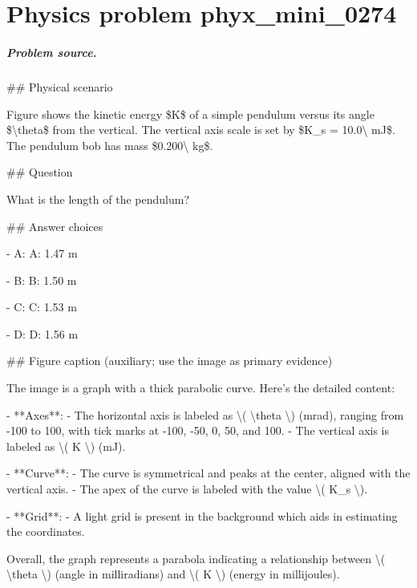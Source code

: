 
\chapter{Physics problem phyx\_mini\_0274}
\label{ch:PhyXMiniProblems_problem_phyx_mini_0274}

\paragraph{Problem source.}
\#\# Physical scenario

Figure shows the kinetic energy \$K\$ of a simple pendulum versus its angle \$\textbackslash{}theta\$ from the vertical. The vertical axis scale is set by \$K\_s = 10.0\textbackslash{} mJ\$. The pendulum bob has mass \$0.200\textbackslash{} kg\$.

\#\# Question

What is the length of the pendulum?

\#\# Answer choices

- A: A: 1.47 m

- B: B: 1.50 m

- C: C: 1.53 m

- D: D: 1.56 m

\#\# Figure caption (auxiliary; use the image as primary evidence)

The image is a graph with a thick parabolic curve. Here's the detailed content:

- **Axes**: 
  - The horizontal axis is labeled as \textbackslash{}( \textbackslash{}theta \textbackslash{}) (mrad), ranging from -100 to 100, with tick marks at -100, -50, 0, 50, and 100.
  - The vertical axis is labeled as \textbackslash{}( K \textbackslash{}) (mJ).

- **Curve**: 
  - The curve is symmetrical and peaks at the center, aligned with the vertical axis.
  - The apex of the curve is labeled with the value \textbackslash{}( K\_s \textbackslash{}).

- **Grid**: 
  - A light grid is present in the background which aids in estimating the coordinates.

Overall, the graph represents a parabola indicating a relationship between \textbackslash{}( \textbackslash{}theta \textbackslash{}) (angle in milliradians) and \textbackslash{}( K \textbackslash{}) (energy in millijoules).

